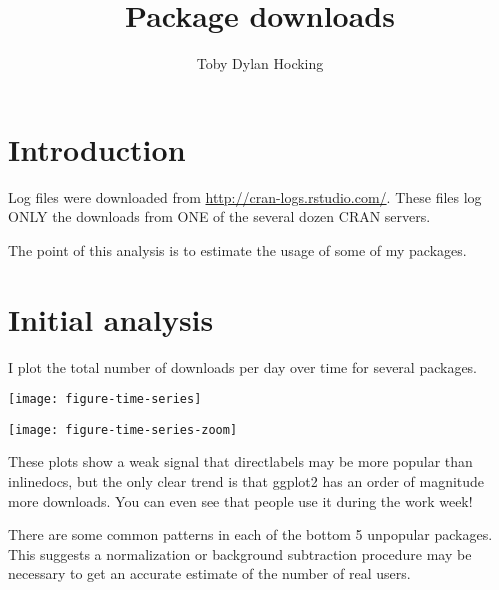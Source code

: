 \documentclass[a4paper]{article}
\begin{document}
\title{Package downloads}
\author{Toby Dylan Hocking}
\maketitle

\section{Introduction}

Log files were downloaded from
\url{http://cran-logs.rstudio.com/}. These files log ONLY the
downloads from ONE of the several dozen CRAN servers.

The point of this analysis is to estimate the usage of some of my
packages.

\newpage

\section{Initial analysis}

I plot the total number of downloads per day over time for several
packages.

\texttt{[image: figure-time-series]}

\texttt{[image: figure-time-series-zoom]}

These plots show a weak signal that directlabels may be more popular
than inlinedocs, but the only clear trend is that ggplot2 has an order
of magnitude more downloads. You can even see that people use it
during the work week!

There are some common patterns in each of the bottom 5 unpopular
packages. This suggests a normalization or background subtraction
procedure may be necessary to get an accurate estimate of the number
of real users.
\end{document}
